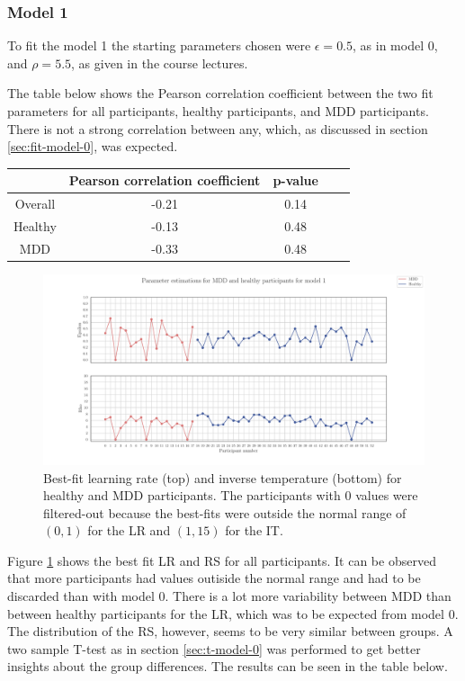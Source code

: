 \documentclass[12pt]{article}
\begin{document}
\subsubsection{Model 1}

To fit the model 1 the starting parameters chosen were $\epsilon=0.5$, as in model 0, and $\rho=5.5$, as given in the course lectures.

The table below shows the Pearson correlation coefficient between the two fit parameters for all participants, healthy participants, and MDD participants. There is not a strong correlation between any, which, as discussed in section \ref{sec:fit-model-0}, was expected.

\begin{center}
 \begin{tabular}{|c || c | c | c| c |} 
 \hline
  & Pearson correlation coefficient & p-value  \\ [0.5ex] 
 \hline\hline
 Overall & -0.21 & 0.14  \\ 
 \hline
 Healthy & -0.13 & 0.48 \\
 \hline
 MDD & -0.33 & 0.48 \\ [1ex] 
 \hline
\end{tabular}
\end{center}

\begin{figure}[h!]
	\centering
	\hspace*{-0.6in}
	\includegraphics[width=1.1\linewidth]{figures/2.6.1.pdf}
	\caption{Best-fit learning rate (top) and inverse temperature (bottom) for healthy and MDD participants. The participants with 0 values were filtered-out because the best-fits were outside the normal range of $(0,1)$ for the LR and $(1, 15)$ for the IT.}
	\label{fig:2.6.1}
\end{figure}

Figure \ref{fig:2.6.1} shows the best fit LR and RS for all participants. It can be observed that more participants had values outiside the normal range and had to be discarded than with model 0. There is a lot more variability between MDD than between healthy participants for the LR, which was to be expected from model 0. The distribution of the RS, however, seems to be very similar between groups. A two sample T-test as in section \ref{sec:t-model-0} was performed to get better insights about the group differences. The results can be seen in the table below.
\end{document}
